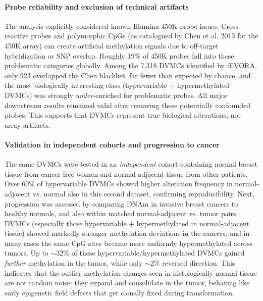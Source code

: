 \documentclass[10pt]{extarticle}
\begin{document}
\paragraph{Probe reliability and exclusion of technical artifacts}
The analysis explicitly considered known Illumina 450K probe issues. Cross-reactive probes and polymorphic CpGs (as catalogued by Chen et al. 2013 for the 450K array) can create artificial methylation signals due to off-target hybridization or SNP overlap. Roughly 19\% of 450K probes fall into these problematic categories globally. Among the 7{,}318 DVMCs identified by iEVORA, only 923 overlapped the Chen blacklist, far fewer than expected by chance, and the most biologically interesting class (hypervariable + hypermethylated DVMCs) was strongly \textit{under}-enriched for problematic probes. All major downstream results remained valid after removing these potentially confounded probes. This supports that DVMCs represent true biological alterations, not array artifacts.

\paragraph{Validation in independent cohorts and progression to cancer}
The same DVMCs were tested in an \textit{independent} cohort containing normal breast tissue from cancer-free women and normal-adjacent tissue from other patients. Over 60\% of hypervariable DVMCs showed higher alteration frequency in normal-adjacent vs. normal also in this second dataset, confirming reproducibility.  
Next, progression was assessed by comparing DNAm in invasive breast cancers to healthy normals, and also within matched normal-adjacent vs. tumor pairs. DVMCs (especially those hypervariable + hypermethylated in normal-adjacent tissue) showed markedly stronger methylation deviations in the cancers, and in many cases the same CpG sites became more uniformly hypermethylated across tumors. Up to $\sim$32\% of these hypervariable/hypermethylated DVMCs gained \textit{further} methylation in the tumor, while only $\sim$2\% reversed direction. This indicates that the outlier methylation changes seen in histologically normal tissue are not random noise: they expand and consolidate in the tumor, behaving like early epigenetic field defects that get clonally fixed during transformation.
\end{document}
